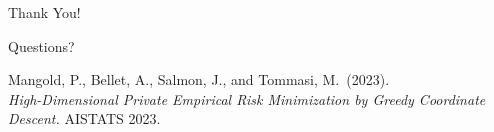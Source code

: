 \documentclass{beamer}
\begin{document}
\begin{frame}[standout]
Thank You!

\vspace{2em}

Questions?

\vspace{2em}

\small
Mangold, P., Bellet, A., Salmon, J., and Tommasi, M.\ (2023). \\
\emph{High-Dimensional Private Empirical Risk Minimization by Greedy Coordinate Descent.} AISTATS 2023.
\end{frame}
\end{document}
